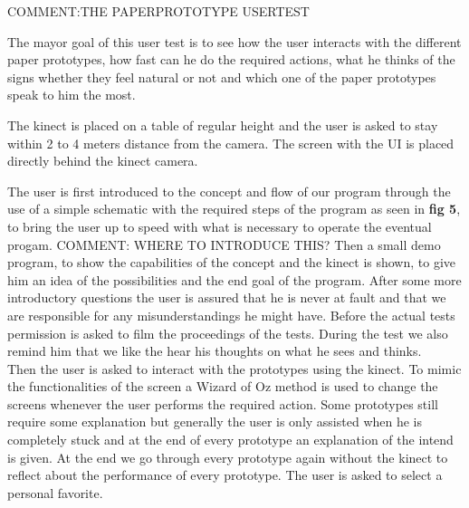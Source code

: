 {\large COMMENT:THE PAPERPROTOTYPE USERTEST}

The mayor goal of this user test is to see how the user interacts with the different paper prototypes, how fast can he do the required actions, what he thinks of the signs whether they feel natural or not and which one of the paper prototypes speak to him the most. 

The kinect is placed on a table of regular height and the user is asked to stay within 2 to 4 meters distance from the camera. The screen with the UI is placed directly behind the kinect camera.

The user is first introduced to the concept and flow of our program through the use of a simple schematic with the required steps of the program as seen in \textbf{ fig 5}, to bring the user up to speed with what is necessary to operate the eventual progam. {\large COMMENT: WHERE TO INTRODUCE THIS?} Then a small demo program, to show the capabilities of the concept and the kinect is shown, to give him an idea of the possibilities and the end goal of the program. After some more introductory questions the user is assured that he is never at fault and that we are responsible for any misunderstandings he might have. Before the actual tests permission is asked to film the proceedings of the tests. During the test we also remind him that we like the hear his thoughts on what he sees and thinks.\\

Then the user is asked to interact with the prototypes using the kinect. To mimic the functionalities of the screen a Wizard of Oz method is used to change the screens whenever the user performs the required action. Some prototypes still require some explanation but generally the user is only assisted when he is completely stuck and at the end of every prototype an explanation of the intend is given. At the end we go through every prototype again without the kinect to reflect about the performance of every prototype. The user is asked to select a personal favorite.

